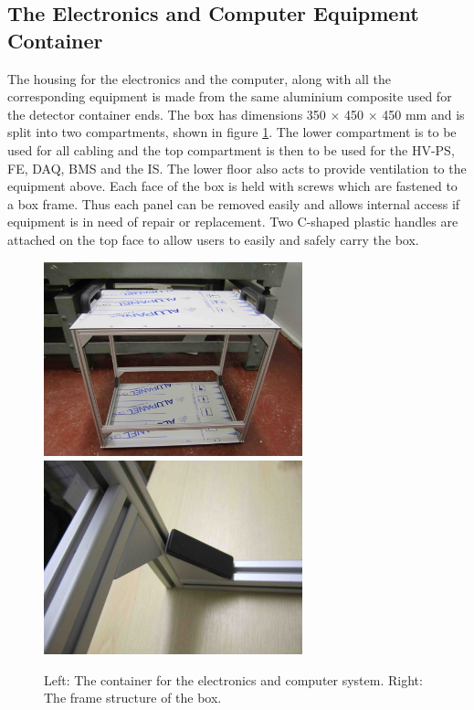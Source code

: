 \subsection{The Electronics and Computer Equipment Container}
The housing for the electronics and the computer, along with all the corresponding equipment is made from the same aluminium composite used for the detector container ends. The box has dimensions 350 $\times$ 450 $\times$ 450 mm and is split into two compartments, shown in figure \ref{fig:electronicsBox}. The lower compartment is to be used for all cabling and the top compartment is then to be used for the HV-PS, FE, DAQ, BMS and the IS. The lower floor also acts to provide ventilation to the equipment above. Each face of the box is held with screws which are fastened to a box frame. Thus each panel can be removed easily and allows internal access if equipment is in need of repair or replacement. Two C-shaped plastic handles are attached on the top face to allow users to easily and safely carry the box.

\begin{figure}[htbp]
\begin{center}
\includegraphics[width=75mm]{Chapter6/figures/electronicsBox3.jpg}
\includegraphics[width=75mm]{Chapter6/figures/electronicsBox2.jpg}
\caption{Left: The container for the electronics and computer system. Right: The frame structure of the box.}
\label{fig:electronicsBox}
\end{center}
\end{figure}


